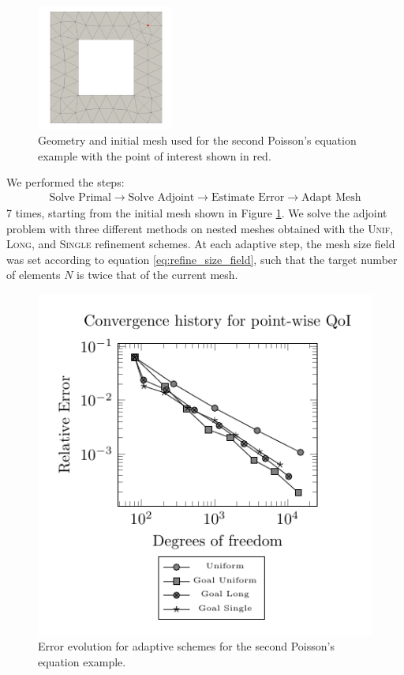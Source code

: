 %
\begin{figure}[ht!]
\centering
\includegraphics[width=0.4\textwidth]{img/refine_squarehole_initial.png}
\caption{Geometry and initial mesh used for the second Poisson's
equation example with the point of interest shown in red.}
\label{fig:refine_poisson2_geom}
\end{figure}

We performed the steps:
\begin{gather*}
\text{Solve Primal} \rightarrow \text{Solve Adjoint} \rightarrow
\text{Estimate Error} \rightarrow \text{Adapt Mesh}
\end{gather*}
7 times, starting from the initial mesh shown in Figure
\ref{fig:refine_poisson2_geom}. We solve the adjoint problem with
three different methods on nested meshes obtained with the
\textsc{Unif}, \textsc{Long}, and \textsc{Single} refinement
schemes. At each adaptive step, the mesh size field was set
according to equation \eqref{eq:refine_size_field}, such that
the target number of elements $N$ is twice that of the current
mesh.

%
\begin{figure}[ht!]
\centering
\includegraphics[width=.75\linewidth]{img/refine_squarehole_convergence.pdf}
\caption{Error evolution for adaptive schemes for the second Poisson's equation
example.}
\label{fig:squarehole_convergence}
\end{figure}

